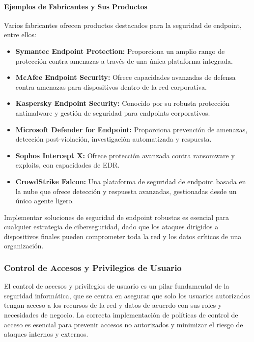\paragraph{Ejemplos de Fabricantes y Sus Productos}

Varios fabricantes ofrecen productos destacados para la seguridad de endpoint, entre ellos:

\begin{itemize}
    \item \textbf{Symantec Endpoint Protection:} Proporciona un amplio rango de protección contra amenazas a través de una única plataforma integrada.
    \item \textbf{McAfee Endpoint Security:} Ofrece capacidades avanzadas de defensa contra amenazas para dispositivos dentro de la red corporativa.
    \item \textbf{Kaspersky Endpoint Security:} Conocido por su robusta protección antimalware y gestión de seguridad para endpoints corporativos.
    \item \textbf{Microsoft Defender for Endpoint:} Proporciona prevención de amenazas, detección post-violación, investigación automatizada y respuesta.
    \item \textbf{Sophos Intercept X:} Ofrece protección avanzada contra ransomware y exploits, con capacidades de EDR.
    \item \textbf{CrowdStrike Falcon:} Una plataforma de seguridad de endpoint basada en la nube que ofrece detección y respuesta avanzadas, gestionadas desde un único agente ligero.
\end{itemize}

Implementar soluciones de seguridad de endpoint robustas es esencial para cualquier estrategia de ciberseguridad, dado que los ataques dirigidos a dispositivos finales pueden comprometer toda la red y los datos críticos de una organización.

\subsubsection{Control de Accesos y Privilegios de Usuario}

El control de accesos y privilegios de usuario es un pilar fundamental de la seguridad informática, que se centra en asegurar que solo los usuarios autorizados tengan acceso a los recursos de la red y datos de acuerdo con sus roles y necesidades de negocio. La correcta implementación de políticas de control de acceso es esencial para prevenir accesos no autorizados y minimizar el riesgo de ataques internos y externos.

